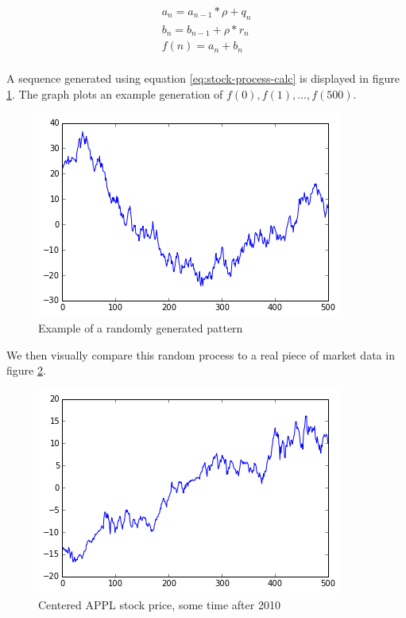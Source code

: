 \documentclass{report}
\begin{document}
\begin{equation}
  \label{eq:stock-process-calc}
  \begin{aligned}
  	a_{n} = a_{n-1} * \rho + q_{n}\\
  	b_{n} = b_{n-1} + \rho * r_{n}\\
  	f(n) = a_{n} + b_{n}\\   
  \end{aligned}
\end{equation}

A sequence generated using equation \ref{eq:stock-process-calc} is displayed in figure \ref{fig:random-process}. The graph plots an example generation of $f(0), f(1), ..., f(500)$.

\begin{figure}[H]
	\caption{Example of a randomly generated pattern}
	\centerline{\includegraphics[width=\textwidth]{vis/random-process.png}}
	\label{fig:random-process}
\end{figure}

We then visually compare this random process to a real piece of market data in figure \ref{fig:appl-process}.

\begin{figure}[H]
	\caption{Centered APPL stock price, some time after 2010}
	\centerline{\includegraphics[width=\textwidth]{vis/appl.png}}
	\label{fig:appl-process}
\end{figure}
\end{document}
